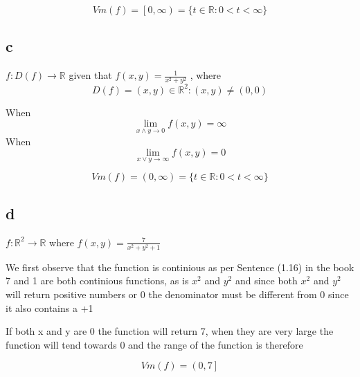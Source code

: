 \documentclass[12pt,a4paper]{article}
\newcommand{\R}{\mathbb{R}}
\begin{document}
\begin{equation} 
Vm(f)=\left[0,\infty\right)=\{t\in\R : 0 < t < \infty \} 
\end{equation}

\subsection{c}


\begin{math} 
f : D(f)\to\R  
\end{math}
given that
\begin{math} 
f(x,y)=\frac{1}{x^2+y^2}
\end{math}
,
where
\begin{equation} 
D(f)={(x,y) \in \R^2 : (x,y) \neq (0,0)}
\end{equation}

When
\begin{equation}
\lim_{x \land y \to 0} f(x,y) = \infty
\end{equation}
When 
 \begin{equation}
\lim_{x \lor y \to \infty} f(x,y)=0 
\end{equation}


\begin{equation} 
Vm(f)=\left(0,\infty\right) =\{t\in\R : 0 < t < \infty \} 
\end{equation}




\subsection{d}
\begin{center}
\begin{math}
f : \R ^2\to \R 
\end{math}
where
\begin{math} 
f(x,y)=\frac{7}{x^2+y^2+1}
\end{math}
\end{center}
\vspace{2 mm} 

We first observe that the function is continious as per Sentence (1.16) \cite{calcbeta1.16} in the book 7 and 1 are both continious functions, as is 
\begin{math}
x^2
\end{math}
and
\begin{math}
y^2
\end{math}
and since both 
\begin{math}
x^2
\end{math}
and
\begin{math}
y^2
\end{math}
will return positive numbers or 0 the denominator must be different from 0 since it also contains a +1

\vspace{2 mm} 
If both x and y are 0 the function will return 7, when they are very large the function will tend towards 0 and the range of the function is therefore

\begin{equation} 
Vm(f)=\left(0,7\right] 
\end{equation}



\printbibliography
\end{document}
